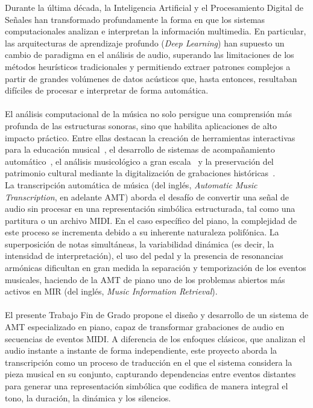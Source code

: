 Durante la última década, la Inteligencia Artificial y el Procesamiento
Digital de Señales han transformado profundamente la forma en que los
sistemas computacionales analizan e interpretan la información multimedia.
En particular, las arquitecturas de aprendizaje profundo (\textit{Deep Learning}) han supuesto un cambio de paradigma en el análisis de audio, superando las limitaciones de los métodos heurísticos tradicionales y permitiendo extraer patrones complejos a partir de grandes volúmenes de datos acústicos que, hasta entonces, resultaban difíciles de procesar e interpretar de forma automática.
\\
\\
El análisis computacional de la música no solo persigue una comprensión
más profunda de las estructuras sonoras, sino que habilita aplicaciones
de alto impacto práctico. Entre ellas destacan la creación de herramientas
interactivas para la educación musical~\cite{benetos2019automatic},
el desarrollo de sistemas de acompañamiento automático~\cite{cont2010coupled}, el análisis musicológico a gran escala~\cite{muller2021fundamentals} y la preservación del patrimonio cultural mediante la digitalización de grabaciones
históricas~\cite{benetos2019automatic}.
\\[2,5cm]
La transcripción automática de música (del inglés, \textit{Automatic Music Transcription}, en adelante AMT) aborda el desafío de convertir una señal de audio sin procesar en una representación simbólica estructurada, tal como una partitura o un archivo MIDI. En el caso específico del piano, la complejidad de este proceso se incrementa debido a su inherente naturaleza polifónica. La superposición de notas simultáneas, la variabilidad dinámica (es decir, la intensidad de interpretación), el uso del pedal y la presencia de resonancias armónicas dificultan en gran medida la separación y temporización de los eventos musicales, haciendo de la AMT de piano uno de los problemas abiertos más activos en MIR (del inglés, \textit{Music Information Retrieval}).
\\
\\
El presente Trabajo Fin de Grado propone el diseño y desarrollo de un sistema de AMT especializado en piano, capaz de transformar grabaciones de audio en secuencias de eventos MIDI. A diferencia de los enfoques clásicos, que analizan el audio instante a instante de forma independiente, este proyecto aborda la transcripción como un proceso de traducción en el que el sistema considera la pieza musical en su conjunto, capturando dependencias entre eventos distantes para generar una representación simbólica que codifica de manera integral el tono,
la duración, la dinámica y los silencios. 
\\[1,5cm]
